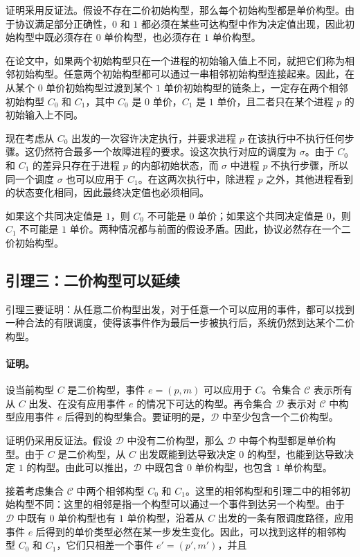 证明采用反证法。假设不存在二价初始构型，那么每个初始构型都是单价构型。由于协议满足部分正确性，$0$ 和 $1$ 都必须在某些可达构型中作为决定值出现，因此初始构型中既必须存在 $0$ 单价构型，也必须存在 $1$ 单价构型。

在论文中，如果两个初始构型只在一个进程的初始输入值上不同，就把它们称为相邻初始构型。任意两个初始构型都可以通过一串相邻初始构型连接起来。因此，在从某个 $0$ 单价初始构型过渡到某个 $1$ 单价初始构型的链条上，一定存在两个相邻初始构型 $C_0$ 和 $C_1$，其中 $C_0$ 是 $0$ 单价，$C_1$ 是 $1$ 单价，且二者只在某个进程 $p$ 的初始输入上不同。

现在考虑从 $C_0$ 出发的一次容许决定执行，并要求进程 $p$ 在该执行中不执行任何步骤。这仍然符合最多一个故障进程的要求。设这次执行对应的调度为 $\sigma$。由于 $C_0$ 和 $C_1$ 的差异只存在于进程 $p$ 的内部初始状态，而 $\sigma$ 中进程 $p$ 不执行步骤，所以同一个调度 $\sigma$ 也可以应用于 $C_1$。在这两次执行中，除进程 $p$ 之外，其他进程看到的状态变化相同，因此最终决定值也必须相同。

如果这个共同决定值是 $1$，则 $C_0$ 不可能是 $0$ 单价；如果这个共同决定值是 $0$，则 $C_1$ 不可能是 $1$ 单价。两种情况都与前面的假设矛盾。因此，协议必然存在一个二价初始构型。

\subsection{引理三：二价构型可以延续}

引理三要证明：从任意二价构型出发，对于任意一个可以应用的事件，都可以找到一种合法的有限调度，使得该事件作为最后一步被执行后，系统仍然到达某个二价构型。

\paragraph{证明。}

设当前构型 $C$ 是二价构型，事件 $e=(p,m)$ 可以应用于 $C$。令集合 $\mathcal{C}$ 表示所有从 $C$ 出发、在没有应用事件 $e$ 的情况下可达的构型。再令集合 $\mathcal{D}$ 表示对 $\mathcal{C}$ 中构型应用事件 $e$ 后得到的构型集合。要证明的是，$\mathcal{D}$ 中至少包含一个二价构型。

证明仍采用反证法。假设 $\mathcal{D}$ 中没有二价构型，那么 $\mathcal{D}$ 中每个构型都是单价构型。由于 $C$ 是二价构型，从 $C$ 出发既能到达导致决定 $0$ 的构型，也能到达导致决定 $1$ 的构型。由此可以推出，$\mathcal{D}$ 中既包含 $0$ 单价构型，也包含 $1$ 单价构型。

接着考虑集合 $\mathcal{C}$ 中两个相邻构型 $C_0$ 和 $C_1$。这里的相邻构型和引理二中的相邻初始构型不同：这里的相邻是指一个构型可以通过一个事件到达另一个构型。由于 $\mathcal{D}$ 中既有 $0$ 单价构型也有 $1$ 单价构型，沿着从 $C$ 出发的一条有限调度路径，应用事件 $e$ 后得到的单价类型必然在某一步发生变化。因此，可以找到这样的相邻构型 $C_0$ 和 $C_1$，它们只相差一个事件 $e'=(p',m')$，并且


